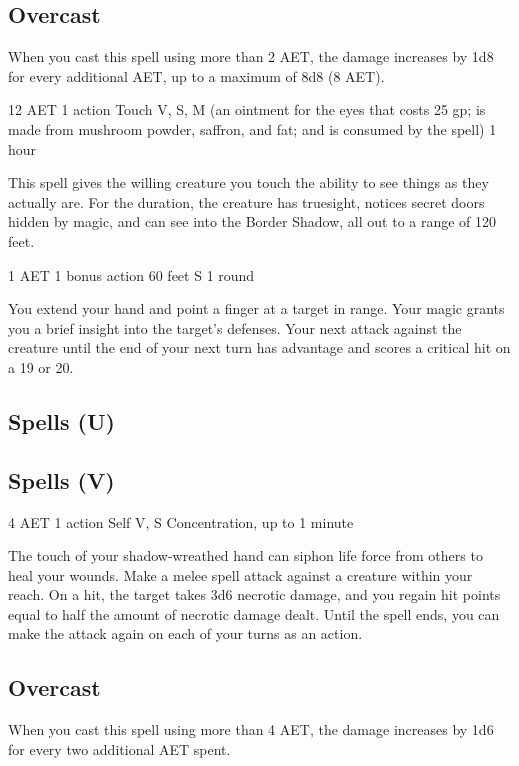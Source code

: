 \subsection*{Overcast} When you cast this spell using more than 2 AET, the damage increases by 1d8 for every additional AET, up to a maximum of 8d8 (8 AET).

\label{spell:true-seeing}
{12 AET}
{1 action}
{Touch}
{V, S, M (an ointment for the eyes that costs 25 gp; is made from mushroom powder, saffron, and fat; and is consumed by the spell)}
{1 hour}

This spell gives the willing creature you touch the ability to see things as they actually are. For the duration, the creature has truesight, notices secret doors hidden by magic, and can see into the Border Shadow, all out to a range of 120 feet.

\label{spell:true-strike}
{1 AET}
{1 bonus action}
{60 feet}
{S}
{1 round}

You extend your hand and point a finger at a target in range. Your magic grants you a brief insight into the target's defenses. Your next attack against the creature until the end of your next turn has advantage and scores a critical hit on a 19 or 20. 

\subsection{Spells (U)}

\subsection{Spells (V)}

\label{spell:vampiric-touch}
{4 AET}
{1 action}
{Self}
{V, S}
{Concentration, up to 1 minute}

The touch of your shadow-wreathed hand can siphon life force from others to heal your wounds. Make a melee spell attack against a creature within your reach. On a hit, the target takes 3d6 necrotic damage, and you regain hit points equal to half the amount of necrotic damage dealt. Until the spell ends, you can make the attack again on each of your turns as an action.

\subsection*{Overcast} When you cast this spell using more than 4 AET, the damage increases by 1d6 for every two additional AET spent.

